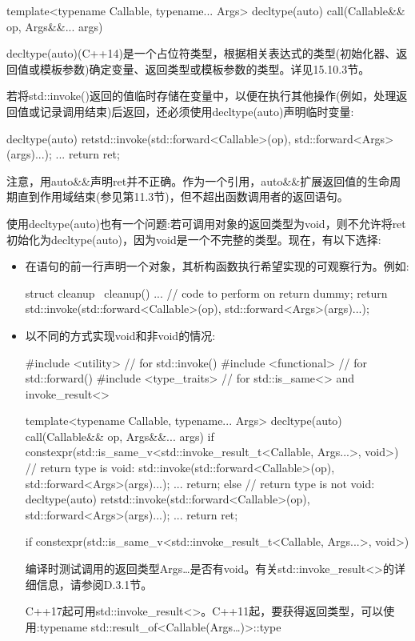 \begin{cpp}
template<typename Callable, typename... Args>
decltype(auto) call(Callable&& op, Args&&... args)
\end{cpp}

decltype(auto)(C++14)是一个占位符类型，根据相关表达式的类型(初始化器、返回值或模板参数)确定变量、返回类型或模板参数的类型。详见15.10.3节。

若将std::invoke()返回的值临时存储在变量中，以便在执行其他操作(例如，处理返回值或记录调用结束)后返回，还必须使用decltype(auto)声明临时变量:

\begin{cpp}
decltype(auto) ret{std::invoke(std::forward<Callable>(op),
				   std::forward<Args>(args)...)};
...
return ret;
\end{cpp}

注意，用auto\&\&声明ret并不正确。作为一个引用，auto\&\&扩展返回值的生命周期直到作用域结束(参见第11.3节)，但不超出函数调用者的返回语句。

使用decltype(auto)也有一个问题:若可调用对象的返回类型为void，则不允许将ret初始化为decltype(auto)，因为void是一个不完整的类型。现在，有以下选择:

\begin{itemize}
\item
在语句的前一行声明一个对象，其析构函数执行希望实现的可观察行为。例如:

\begin{cpp}
struct cleanup {
	~cleanup() {
		... // code to perform on return
	}
} dummy;
return std::invoke(std::forward<Callable>(op),
					std::forward<Args>(args)...);
\end{cpp}

\item
以不同的方式实现void和非void的情况:

\begin{cpp}
#include <utility> // for std::invoke()
#include <functional> // for std::forward()
#include <type_traits> // for std::is_same<> and invoke_result<>

template<typename Callable, typename... Args>
decltype(auto) call(Callable&& op, Args&&... args)
{
	if constexpr(std::is_same_v<std::invoke_result_t<Callable, Args...>,
	void>) {
		// return type is void:
		std::invoke(std::forward<Callable>(op),
					std::forward<Args>(args)...);
		...
		return;
	}
	else {
		// return type is not void:
		decltype(auto) ret{std::invoke(std::forward<Callable>(op),
							std::forward<Args>(args)...)};
		...
		return ret;
	}
}
\end{cpp}

\begin{cpp}
if constexpr(std::is_same_v<std::invoke_result_t<Callable, Args...>, void>)
\end{cpp}

编译时测试调用的返回类型Args…是否有void。有关std::invoke\_result<>的详细信息，请参阅D.3.1节。

\begin{notice}
C++17起可用std::invoke\_result<>。C++11起，要获得返回类型，可以使用:typename std::result\_of<Callable(Args…)>::type
\end{notice}

\end{itemize}

